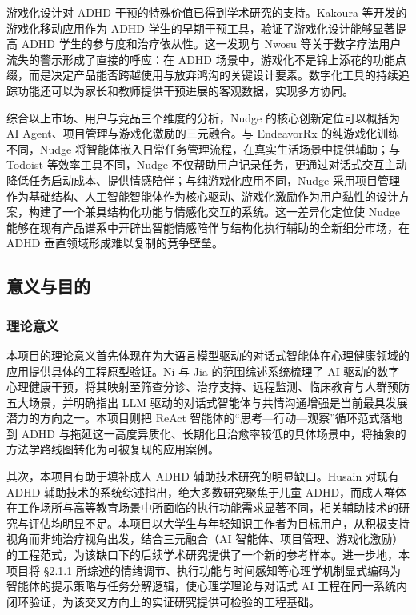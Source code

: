 \par 游戏化设计对 ADHD 干预的特殊价值已得到学术研究的支持。Kakoura 等开发的游戏化移动应用作为 ADHD 学生的早期干预工具，验证了游戏化设计能够显著提高 ADHD 学生的参与度和治疗依从性\cite{kakoura2024mobile}。这一发现与 Nwosu 等关于数字疗法用户流失的警示形成了直接的呼应：在 ADHD 场景中，游戏化不是锦上添花的功能点缀，而是决定产品能否跨越使用与放弃鸿沟的关键设计要素。数字化工具的持续追踪功能还可以为家长和教师提供干预进展的客观数据，实现多方协同。

\par 综合以上市场、用户与竞品三个维度的分析，Nudge 的核心创新定位可以概括为 AI Agent、项目管理与游戏化激励的三元融合。与 EndeavorRx 的纯游戏化训练不同，Nudge 将智能体嵌入日常任务管理流程，在真实生活场景中提供辅助；与 Todoist 等效率工具不同，Nudge 不仅帮助用户记录任务，更通过对话式交互主动降低任务启动成本、提供情感陪伴；与纯游戏化应用不同，Nudge 采用项目管理作为基础结构、人工智能智能体作为核心驱动、游戏化激励作为用户黏性的设计方案，构建了一个兼具结构化功能与情感化交互的系统。这一差异化定位使 Nudge 能够在现有产品谱系中开辟出智能情感陪伴与结构化执行辅助的全新细分市场，在 ADHD 垂直领域形成难以复制的竞争壁垒。

\subsection{意义与目的}


\subsubsection{理论意义}

\par 本项目的理论意义首先体现在为大语言模型驱动的对话式智能体在心理健康领域的应用提供具体的工程原型验证。Ni 与 Jia 的范围综述系统梳理了 AI 驱动的数字心理健康干预，将其映射至筛查分诊、治疗支持、远程监测、临床教育与人群预防五大场景，并明确指出 LLM 驱动的对话式智能体与共情沟通增强是当前最具发展潜力的方向之一\cite{ni2026scoping}。本项目则把 ReAct 智能体的``思考—行动—观察''循环范式落地到 ADHD 与拖延这一高度异质化、长期化且治愈率较低的具体场景中，将抽象的方法学路线图转化为可被复现的应用案例。

\par 其次，本项目有助于填补成人 ADHD 辅助技术研究的明显缺口。Husain 对现有 ADHD 辅助技术的系统综述指出，绝大多数研究聚焦于儿童 ADHD，而成人群体在工作场所与高等教育场景中所面临的执行功能需求显著不同，相关辅助技术的研究与评估均明显不足\cite{husain2020investigating}。本项目以大学生与年轻知识工作者为目标用户，从积极支持视角而非纯治疗视角出发，结合三元融合（AI 智能体、项目管理、游戏化激励）的工程范式，为该缺口下的后续学术研究提供了一个新的参考样本。进一步地，本项目将 §2.1.1 所综述的情绪调节、执行功能与时间感知等心理学机制显式编码为智能体的提示策略与任务分解逻辑，使心理学理论与对话式 AI 工程在同一系统内闭环验证，为该交叉方向上的实证研究提供可检验的工程基础。

